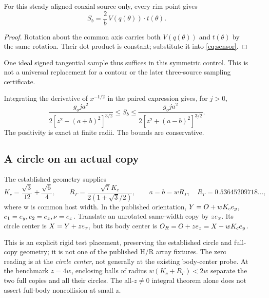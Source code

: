 \begin{corollary}\label{cor:onesample}
For this steady aligned coaxial source only, every rim point gives
\begin{equation}\label{eq:onesample}
S_b=\frac2b\,V(q(\theta))\cdot t(\theta).
\end{equation}
\end{corollary}
\begin{proof}
Rotation about the common axis carries both \(V(q(\theta))\) and \(t(\theta)\) by the same rotation. Their dot product is constant; substitute it into \eqref{eq:sensor}.
\end{proof}
One ideal signed tangential sample thus suffices in this symmetric control. This is not a universal replacement for a contour or the later three-source sampling certificate.

Integrating the derivative of \(x^{-1/2}\) in the paired expression gives, for \(j>0\),
\begin{equation}\label{eq:coaxbounds}
\frac{g_oj a^2}{2[z^2+(a+b)^2]^{3/2}}
\le S_b\le
\frac{g_oj a^2}{2[z^2+(a-b)^2]^{3/2}}.
\end{equation}
The positivity is exact at finite radii. The bounds are conservative.

\subsection{A circle on an actual copy}
The established geometry supplies~\cite{PAIR}
\begin{equation}\label{eq:geometryconstants}
K_c=\frac{\sqrt3}{12}+\frac{\sqrt6}{4},\qquad
R_\Gamma=\frac{\sqrt7K_c}{2(1+\sqrt3/2)},\qquad
a=b=wR_\Gamma,\quad R_\Gamma=0.53645209718\ldots,
\end{equation}
where w is common host width. In the published orientation, \(Y=O+wK_ce_y\), \(e_1=e_y,e_2=e_z,\nu=e_x\). Translate an unrotated same-width copy by \(ze_x\). Its circle center is \(X=Y+ze_x\), but its body center is \(O_R=O+ze_x=X-wK_ce_y\).

This is an explicit rigid test placement, preserving the established circle and full-copy geometry; it is not one of the published H/R array fixtures. The zero reading is at the \emph{circle center}, not generally at the existing body-center probe. At the benchmark \(z=4w\), enclosing balls of radius \(w(K_c+R_\Gamma)<2w\) separate the two full copies and all their circles. The all-\(z\ne0\) integral theorem alone does not assert full-body noncollision at small z.
